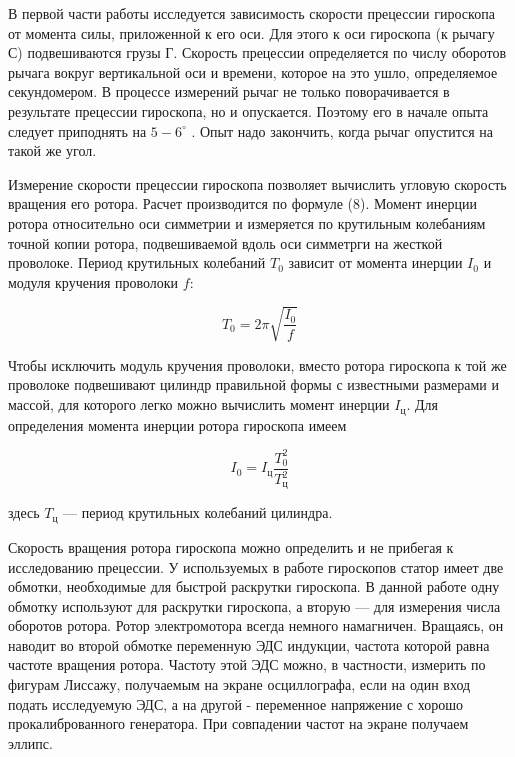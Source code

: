\documentclass[14pt]{article}
\begin{document}
В первой части работы исследуется зависимость скорости прецессии гироскопа от момента силы, приложенной к его оси. Для этого к оси гироскопа (к рычагу С) подвешиваются грузы Г. Скорость прецессии определяется по числу оборотов рычага вокруг вертикальной оси и времени, которое на это ушло, определяемое секундомером. В процессе измерений рычаг не только поворачивается в результате прецессии гироскопа, но и опускается. Поэтому его в начале опыта следует приподнять на $5-6^{\circ}$ . Опыт надо закончить, когда рычаг опустится на такой же угол.

Измерение скорости прецессии гироскопа позволяет вычислить угловую скорость вращения его ротора. Расчет производится по формуле (8). Момент инерции ротора относительно оси симметрии и измеряется по крутильным колебаниям точной копии ротора, подвешиваемой вдоль оси симметрги на жесткой проволоке. Период крутильных колебаний $T_0$ зависит от момента инерции $I_0$ и модуля кручения проволоки $f$:

\begin{equation}
T_0 = 2\pi\sqrt{\frac{I_0}{f}}
\end{equation}

Чтобы исключить модуль кручения проволоки, вместо ротора гироскопа к той же проволоке подвешивают цилиндр правильной формы с известными размерами и массой, для которого легко можно вычислить момент инерции $I_{\text{ц}}$. Для определения момента инерции ротора гироскопа имеем

\begin{equation}
I_0 = I_{\text{ц}}\frac{T_0^2}{T_{\text{ц}}^2}
\end{equation}

\noindent здесь $T_{\text{ц}}$ --- период крутильных колебаний цилиндра.

Скорость вращения ротора гироскопа можно определить и не прибегая к исследованию прецессии. У используемых в работе гироскопов статор имеет две обмотки, необходимые для быстрой раскрутки гироскопа. В данной работе одну обмотку используют для раскрутки гироскопа, а вторую --- для измерения числа оборотов ротора. Ротор электромотора всегда немного намагничен. Вращаясь, он наводит во второй обмотке переменную ЭДС индукции,
частота которой равна частоте вращения ротора. Частоту этой ЭДС можно, в частности, измерить по фигурам Лиссажу, получаемым на экране осциллографа, если на один вход подать исследуемую ЭДС, а на другой - переменное напряжение с хорошо прокалиброванного генератора. При совпадении частот на экране получаем эллипс.
\end{document}
